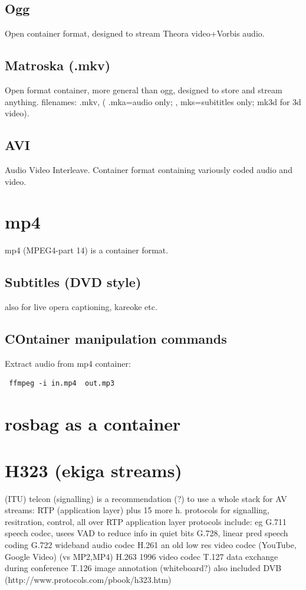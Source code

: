 \documentclass[oneside,english]{scrbook}
\begin{document}
\section{Ogg}
Open container format, designed to stream Theora video+Vorbis audio.

\section{Matroska (.mkv)}
Open format container, more general than ogg, designed to store and stream anything.
filenames: .mkv,  ( .mka=audio only; , mks=subititles only; mk3d for 3d video).

\section{AVI}
Audio Video Interleave. Container format containing variously coded audio and video.

\chapter{mp4}
mp4 (MPEG4-part 14) is a container format.

\section{Subtitles (DVD style)}
also for live opera captioning, kareoke etc.

\section{COntainer manipulation commands}

Extract audio from mp4 container:
\begin{lstlisting}
 ffmpeg -i in.mp4  out.mp3
\end{lstlisting}


\chapter{rosbag as a container}

\chapter{H323 (ekiga streams)}
 (ITU) telcon  (signalling)
	is a recommendation (?) to use a whole stack for AV streams:
		RTP (application layer)		
		plus 15 more h. protocols for signalling, resitration, control, all over RTP
		application layer protocols include:
			eg G.711 speech codec, usees VAD to reduce info in quiet bits
			    G.728, linear pred speech coding
			G.722 wideband audio codec
			H.261 an old low res video codec (YouTube, Google Video) (vs MP2,MP4)
			H.263 1996 video codec
			T.127 data exchange during conference
			T.126 image annotation (whiteboard?)
		also included DVB
		(http://www.protocols.com/pbook/h323.htm)
\end{document}
